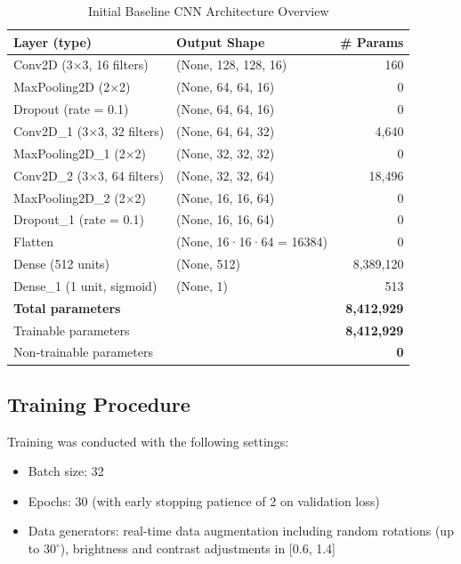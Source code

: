\documentclass[conference]{IEEEtran}
\begin{document}
\begin{table}[htbp]
	\caption{Initial Baseline CNN Architecture Overview}
	\label{table:cnn_overview}
	\centering
	\begin{adjustbox}{width=0.48\textwidth}
		\begin{tabular}{|l|l|r|}
			\hline
			\textbf{Layer (type)} & \textbf{Output Shape} & \textbf{\# Params} \\
			\hline
			Conv2D (3×3, 16 filters)       & (None, 128, 128, 16)   &    160  \\
			MaxPooling2D (2×2)             & (None, 64, 64, 16)     &      0  \\
			Dropout (rate = 0.1)           & (None, 64, 64, 16)     &      0  \\
			Conv2D\_1 (3×3, 32 filters)    & (None, 64, 64, 32)     &  4,640  \\
			MaxPooling2D\_1 (2×2)          & (None, 32, 32, 32)     &      0  \\
			Conv2D\_2 (3×3, 64 filters)    & (None, 32, 32, 64)     & 18,496  \\
			MaxPooling2D\_2 (2×2)          & (None, 16, 16, 64)     &      0  \\
			Dropout\_1 (rate = 0.1)        & (None, 16, 16, 64)     &      0  \\
			Flatten                        & (None, 16·16·64 = 16384)&      0  \\
			Dense (512 units)              & (None, 512)            & 8,389,120\\
			Dense\_1 (1 unit, sigmoid)     & (None, 1)              &     513 \\
			\hline
			\multicolumn{2}{|l|}{\textbf{Total parameters}} & \textbf{8,412,929} \\
			\multicolumn{2}{|l|}{Trainable parameters}       & \textbf{8,412,929} \\
			\multicolumn{2}{|l|}{Non‑trainable parameters}   & \textbf{0}        \\
			\hline
		\end{tabular}
	\end{adjustbox}
\end{table}

\subsection{Training Procedure}
Training was conducted with the following settings:
\begin{itemize}
	\item Batch size: 32
	\item Epochs: 30 (with early stopping patience of 2 on validation loss)
	\item Data generators: real-time data augmentation including random rotations (up to $30^\circ$), brightness and contrast adjustments in [0.6, 1.4]
\end{itemize}
\end{document}
